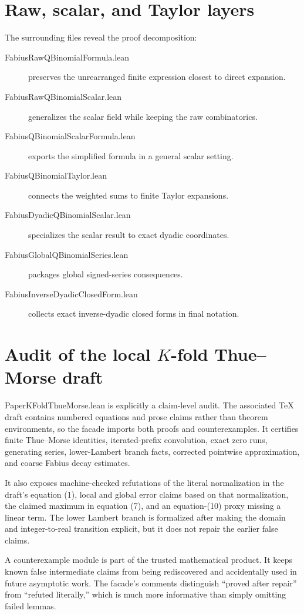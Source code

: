 \documentclass[11pt,a4paper,openany]{book}
\def\module#1{#1.lean}
\newcommand{\module}[1]{\nolinkurl{#1.lean}}
\begin{document}
\section{Raw, scalar, and Taylor layers}
The surrounding files reveal the proof decomposition:
\begin{description}
\item[\module{FabiusRawQBinomialFormula}] preserves the unrearranged finite
expression closest to direct expansion.
\item[\module{FabiusRawQBinomialScalar}] generalizes the scalar field while
keeping the raw combinatorics.
\item[\module{FabiusQBinomialScalarFormula}] exports the simplified formula in
a general scalar setting.
\item[\module{FabiusQBinomialTaylor}] connects the weighted sums to finite
Taylor expansions.
\item[\module{FabiusDyadicQBinomialScalar}] specializes the scalar result to
exact dyadic coordinates.
\item[\module{FabiusGlobalQBinomialSeries}] packages global signed-series
consequences.
\item[\module{FabiusInverseDyadicClosedForm}] collects exact inverse-dyadic
closed forms in final notation.
\end{description}

\section{Audit of the local \texorpdfstring{$K$-fold}{K-fold} Thue--Morse draft}
\module{PaperKFoldThueMorse} is explicitly a claim-level audit.  The associated
TeX draft contains numbered equations and prose claims rather than theorem
environments, so the facade imports both proofs and counterexamples.  It
certifies finite Thue--Morse identities, iterated-prefix convolution, exact
zero runs, generating series, lower-Lambert branch facts, corrected pointwise
approximation, and coarse Fabius decay estimates.

It also exposes machine-checked refutations of the literal normalization in the
draft's equation (1), local and global error claims based on that normalization,
the claimed maximum in equation (7), and an equation-(10) proxy missing a
linear term.  The lower Lambert branch is formalized after making the domain
and integer-to-real transition explicit, but it does not repair the earlier
false claims.

\begin{engineering}
A counterexample module is part of the trusted mathematical product.  It keeps
known false intermediate claims from being rediscovered and accidentally used
in future asymptotic work.  The facade's comments distinguish “proved after
repair” from “refuted literally,” which is much more informative than simply
omitting failed lemmas.
\end{engineering}
\end{document}
